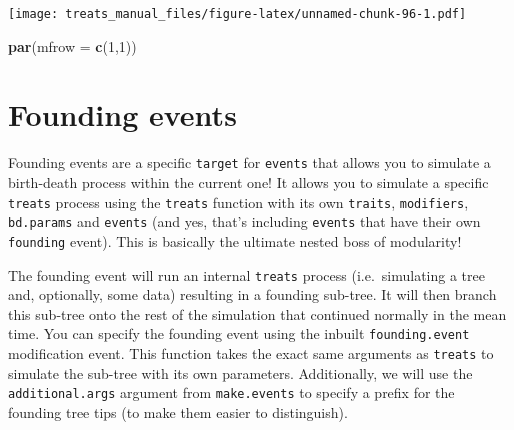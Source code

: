 \documentclass[
]{book}
\newenvironment{Shaded}{\begin{snugshade}}{\end{snugshade}}
\newcommand{\DataTypeTok}[1]{\textcolor[rgb]{0.13,0.29,0.53}{#1}}
\newcommand{\DecValTok}[1]{\textcolor[rgb]{0.00,0.00,0.81}{#1}}
\newcommand{\KeywordTok}[1]{\textcolor[rgb]{0.13,0.29,0.53}{\textbf{#1}}}
\newcommand{\NormalTok}[1]{#1}
\begin{document}
\texttt{[image: treats\_manual\_files/figure-latex/unnamed-chunk-96-1.pdf]}

\begin{Shaded}
\begin{Highlighting}[]
\KeywordTok{par}\NormalTok{(}\DataTypeTok{mfrow =} \KeywordTok{c}\NormalTok{(}\DecValTok{1}\NormalTok{,}\DecValTok{1}\NormalTok{))}
\end{Highlighting}
\end{Shaded}

\hypertarget{founding}{%
\section{Founding events}\label{founding}}

Founding events are a specific \texttt{target} for \texttt{events} that allows you to simulate a birth-death process within the current one!
It allows you to simulate a specific \texttt{treats} process using the \texttt{treats} function with its own \texttt{traits}, \texttt{modifiers}, \texttt{bd.params} and \texttt{events} (and yes, that's including \texttt{events} that have their own \texttt{founding} event).
This is basically the ultimate nested boss of modularity!

The founding event will run an internal \texttt{treats} process (i.e.~simulating a tree and, optionally, some data) resulting in a founding sub-tree.
It will then branch this sub-tree onto the rest of the simulation that continued normally in the mean time.
You can specify the founding event using the inbuilt \texttt{founding.event} modification event.
This function takes the exact same arguments as \texttt{treats} to simulate the sub-tree with its own parameters.
Additionally, we will use the \texttt{additional.args} argument from \texttt{make.events} to specify a prefix for the founding tree tips (to make them easier to distinguish).
\end{document}
